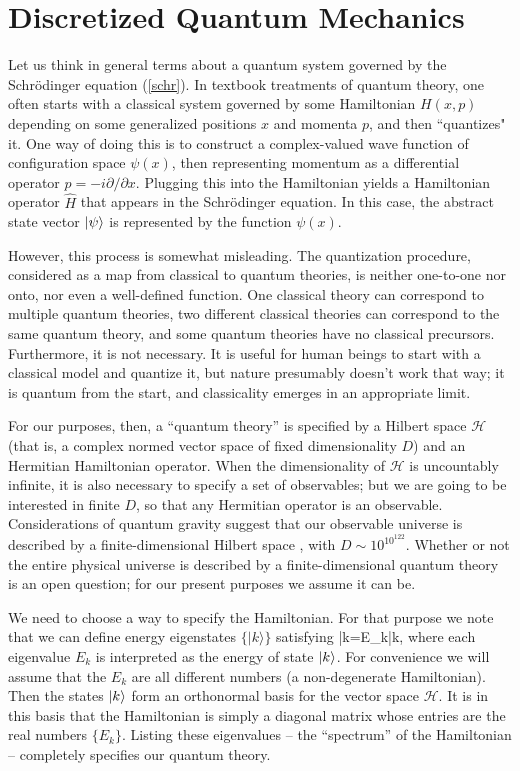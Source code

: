 \documentclass[aps,prd,nofootinbib,notitlepage,12pt]{revtex4-2}
\begin{document}
\section{Discretized Quantum Mechanics}

Let us think in general terms about a quantum system governed by the Schr\"odinger equation (\ref{schr}).
In textbook treatments of quantum theory, one often starts with a classical system governed by some Hamiltonian $H(x,p)$ depending on some generalized positions $x$ and momenta $p$, and then ``quantizes" it. 
One way of doing this is to construct a complex-valued wave function of configuration space $\psi(x)$, then representing momentum as a differential operator $\hat{p} = -i \partial/\partial x$.
Plugging this into the Hamiltonian yields a Hamiltonian operator $\hat{H}$ that appears in the Schr\"odinger equation.
In this case, the abstract state vector $\lvert \psi\rangle$ is represented by the function $\psi(x)$.

However, this process is somewhat misleading.
The quantization procedure, considered as a map from classical to quantum theories, is neither one-to-one nor onto, nor even a well-defined function.
One classical theory can correspond to multiple quantum theories, two different classical theories can correspond to the same quantum theory, and some quantum theories have no classical precursors.
Furthermore, it is not necessary.
It is useful for human beings to start with a classical model and quantize it, but nature presumably doesn't work that way; it is quantum from the start, and classicality emerges in an appropriate limit.

For our purposes, then, a ``quantum theory'' is specified by a Hilbert space $\mathcal H$ (that is, a complex normed vector space of fixed dimensionality $D$) and an Hermitian Hamiltonian operator.
When the dimensionality of $\mathcal H$ is uncountably infinite, it is also necessary to specify a set of observables; but we are going to be interested in finite $D$, so that any Hermitian operator is an observable.
Considerations of quantum gravity suggest that our observable universe is described by a finite-dimensional Hilbert space \cite{Bao:2017rnv}, with $D\sim 10^{10^{122}}$.
Whether or not the entire physical universe is described by a finite-dimensional quantum theory is an open question; for our present purposes we assume it can be.

We need to choose a way to specify the Hamiltonian.
For that purpose we note that we can define energy eigenstates  $\{|k\rangle\}$ satisfying 
\be
  \left|k\right\rangle=E_k\left|k\right\rangle,
  \label{eigenbasis}
\ee
where each eigenvalue $E_k$ is interpreted as the energy of state $\lvert k\rangle$.
For convenience we will assume that the $E_k$ are all different numbers (a non-degenerate Hamiltonian).
Then the states $\lvert k\rangle$ form an orthonormal basis for the vector space $\mathcal H$.
It is in this basis that the Hamiltonian is simply a diagonal matrix whose entries are the real numbers $\{E_k\}$.
Listing these eigenvalues -- the ``spectrum'' of the Hamiltonian -- completely specifies our quantum theory.
\end{document}
